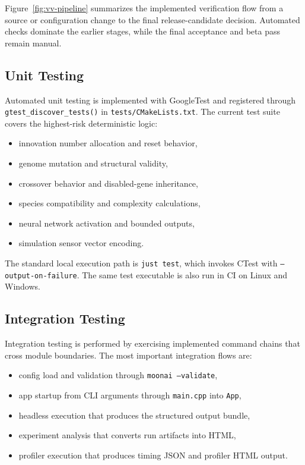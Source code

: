 Figure~\ref{fig:vv-pipeline} summarizes the implemented verification flow from a source or
configuration change to the final release-candidate decision. Automated checks dominate the
earlier stages, while the final acceptance and beta pass remain manual.

\subsection{Unit Testing}

Automated unit testing is implemented with GoogleTest and registered through
\texttt{gtest\_discover\_tests()} in \texttt{tests/CMakeLists.txt}. The current test
suite covers the highest-risk deterministic logic:

\begin{itemize}[nosep]
	\item innovation number allocation and reset behavior,
	\item genome mutation and structural validity,
	\item crossover behavior and disabled-gene inheritance,
	\item species compatibility and complexity calculations,
	\item neural network activation and bounded outputs,
	\item simulation sensor vector encoding.
\end{itemize}

The standard local execution path is \texttt{just test}, which invokes CTest with
\texttt{--output-on-failure}. The same test executable is also run in CI on Linux and
Windows.

\subsection{Integration Testing}

Integration testing is performed by exercising implemented command chains that cross module
boundaries. The most important integration flows are:

\begin{itemize}[nosep]
	\item config load and validation through \texttt{moonai --validate},
	\item app startup from CLI arguments through \texttt{main.cpp} into \texttt{App},
	\item headless execution that produces the structured output bundle,
	\item experiment analysis that converts run artifacts into HTML,
	\item profiler execution that produces timing JSON and profiler HTML output.
\end{itemize}


